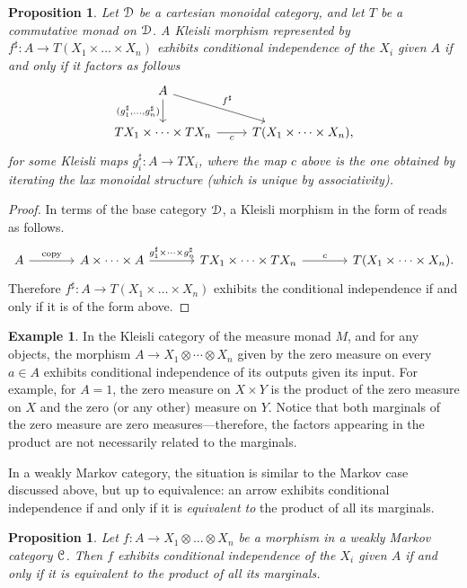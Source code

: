 \documentclass[a4paper,UKenglish,numberwithinsect,cleveref, autoref, thm-restate]{lipics-v2021}
\theoremstyle{plain} %
\newtheorem{myproposition}[mytheorem]{Proposition}
\theoremstyle{definition} %
\newtheorem{myexample}[mytheorem]{Example}
\begin{document}
\begin{myproposition}\label{indepkleisli}
 Let $\mathcal{D}$ be a cartesian monoidal category, and let $T$ be a commutative monad on $\mathcal{D}$.
 A Kleisli morphism represented by $f^\sharp:A\to T(X_1\times\dots\times X_n)$ exhibits conditional independence of the $X_i$ given $A$ if and only if it factors as follows
 \[
 \begin{tikzcd}
  A \ar{d}[swap]{(g_1^\sharp,\dots,g_n^\sharp)} \ar{dr}{f^\sharp} \\
  TX_1\times\dots\times TX_n \ar{r}[swap]{c} & T(X_1\times\dots\times X_n) ,
 \end{tikzcd}
 \]
 for some Kleisli maps $g_i^\sharp:A\to TX_i$,
 where the map $c$ above is the one obtained by iterating the lax monoidal structure (which is unique by associativity). 
\end{myproposition}
\begin{proof}
 In terms of the base category $\mathcal{D}$, a Kleisli morphism in the form of  reads as follows.
 \[
  \begin{tikzcd}[sep=large]
   A \ar{r}{\mathrm{copy}} & A\times\dots\times A \ar{r}{g_1^\sharp\times\dots\times g_n^\sharp} & TX_1\times\dots\times TX_n \ar{r}{c} & T(X_1\times\dots\times X_n) .
  \end{tikzcd}
 \]
 Therefore $f^\sharp:A\to T(X_1\times\dots\times X_n)$ exhibits the conditional independence if and only if it is of the form above.
\end{proof}

\begin{myexample}
	In the Kleisli category of the measure monad $M$, and for any objects, the morphism $A \to X_1 \otimes \cdots \otimes X_n$ given by the zero measure on every $a \in A$ exhibits conditional independence of its outputs given its input. For example, for $A=1$, the zero measure on $X\times Y$ is the product of the zero measure on $X$ and the zero (or any other) measure on $Y$.
 Notice that both marginals of the zero measure are zero measures---therefore, the factors appearing in the product are not necessarily related to the marginals.
\end{myexample}

In a weakly Markov category, the situation is similar to the Markov case discussed above,
but up to equivalence: an arrow exhibits conditional independence if and only if it is \emph{equivalent to} the product of all its marginals.

\begin{myproposition}\label{eqcondind}
 Let $f:A\to X_1\otimes\dots\otimes X_n$ be a morphism in a weakly Markov category $\mathcal{C}$. Then $f$ exhibits conditional independence of the $X_i$ given $A$ if and only if it is equivalent to the product of all its marginals.
\end{myproposition}
\end{document}
